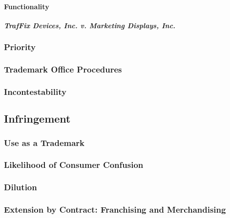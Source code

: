 \paragraph{Functionality}


\paragraph{\emph{TrafFix Devices, Inc. v. Marketing Displays, Inc.}}


\subsubsection{Priority}


\subsubsection{Trademark Office Procedures}


\subsubsection{Incontestability}


\subsection{Infringement}

\subsubsection{Use as a Trademark}


\subsubsection{Likelihood of Consumer Confusion}


\subsubsection{Dilution}


\subsubsection{Extension by Contract: Franchising and Merchandising}

